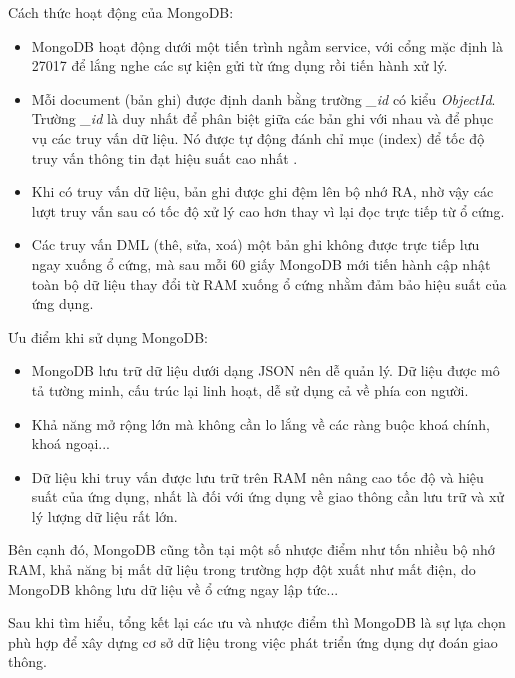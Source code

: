 Cách thức hoạt động của MongoDB:
\begin{itemize}
    \item MongoDB hoạt động dưới một tiến trình ngầm service, với cổng mặc định là 27017 để lắng nghe các sự kiện gửi từ ứng dụng rồi tiến hành xử lý.
    \item Mỗi document (bản ghi) được định danh bằng trường \textit{\_id} có kiểu \textit{ObjectId}. Trường \textit{\_id} là duy nhất để phân biệt giữa các bản ghi với nhau và để phục vụ các truy vấn dữ liệu. Nó được tự động đánh chỉ mục (index) để tốc độ truy vấn thông tin đạt hiệu suất cao nhất \cite{MongoDB2}.
    \item Khi có truy vấn dữ liệu, bản ghi được ghi đệm lên bộ nhớ RA, nhờ vậy các lượt truy vấn sau có tốc độ xử lý cao hơn thay vì lại đọc trực tiếp từ ổ cứng.
    \item Các truy vấn DML (thê, sửa, xoá) một bản ghi không được trực tiếp lưu ngay xuống ổ cứng, mà sau mỗi 60 giấy MongoDB mới tiến hành cập nhật toàn bộ dữ liệu thay đổi từ RAM xuống ổ cứng \cite{MongoDB3} nhằm đảm bảo hiệu suất của ứng dụng.
\end{itemize}

Ưu điểm khi sử dụng MongoDB:
\begin{itemize}
    \item MongoDB lưu trữ dữ liệu dưới dạng JSON nên dễ quản lý. Dữ liệu được mô tả tường minh, cấu trúc lại linh hoạt, dễ sử dụng cả về phía con người.
    \item Khả năng mở rộng lớn mà không cần lo lắng về các ràng buộc khoá chính, khoá ngoại...
    \item Dữ liệu khi truy vấn được lưu trữ trên RAM nên nâng cao tốc độ và hiệu suất của ứng dụng, nhất là đối với ứng dụng về giao thông cần lưu trữ và xử lý lượng dữ liệu rất lớn.
\end{itemize}

Bên cạnh đó, MongoDB cũng tồn tại một số nhược điểm như tốn nhiều bộ nhớ RAM, khả năng bị mất dữ liệu trong trường hợp đột xuất như mất điện, do MongoDB không lưu dữ liệu về ổ cứng ngay lập tức... 

Sau khi tìm hiểu, tổng kết lại các ưu và nhược điểm thì MongoDB là sự lựa chọn phù hợp để xây dựng cơ sở dữ liệu trong việc phát triển ứng dụng dự đoán giao thông.

